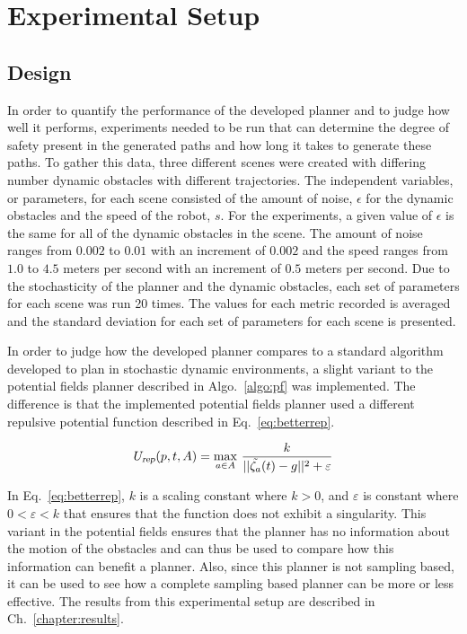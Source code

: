 


\chapter{Experimental Setup}

\label{chapter:experimentalsetup}

\section{Design}

In order to quantify the performance of the developed planner and to judge how
well it performs, experiments needed to be run that can determine the degree of
safety present in the generated paths and how long it takes to generate these
paths. To gather this data, three different scenes were created with differing
number dynamic obstacles with different trajectories. The independent
variables, or parameters, for each scene consisted of the amount of noise,
$\epsilon$ for the dynamic obstacles and the speed of the robot, $s$. For the
experiments, a given value of $\epsilon$ is the same for all of the dynamic
obstacles in the scene. The amount of noise ranges from $0.002$ to $0.01$ with
an increment of $0.002$ and the speed ranges from $1.0$ to $4.5$ meters per
second with an increment of $0.5$ meters per second. Due to the stochasticity
of the planner and the dynamic obstacles, each set of parameters for each scene
was run 20 times. The values for each metric recorded is averaged and the
standard deviation for each set of parameters for each scene is presented.

In order to judge how the developed planner compares to a standard algorithm
developed to plan in stochastic dynamic environments, a slight variant to the
potential fields planner described in Algo.~\ref{algo:pf} was implemented. The
difference is that the implemented potential fields planner used a different
repulsive potential function described in Eq.~\ref{eq:betterrep}.

\begin{equation}
    U_{\Var{rep}}(p, t, A) = \max_{a \in A} \,
    \frac{k}{||\tilde{\zeta_a}(t) - g||^2 + \varepsilon}
    \label{eq:betterrep}
\end{equation}

In Eq.~\ref{eq:betterrep}, $k$ is a scaling constant where $k > 0$, and
$\varepsilon$ is constant where $0 < \varepsilon < k$ that ensures that the
function does not exhibit a singularity. This variant in the potential fields
ensures that the planner has no information about the motion of the obstacles
and can thus be used to compare how this information can benefit a planner.
Also, since this planner is not sampling based, it can be used to see how a
complete sampling based planner can be more or less effective. The results from
this experimental setup are described in Ch.~\ref{chapter:results}.

